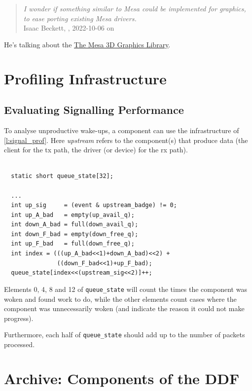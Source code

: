 \documentclass[a4paper,12pt]{report}
\newcommand{\code}[1]{\texttt{#1}}
\begin{document}
\begin{quotation}{\em
  I wonder if something similar to Mesa could be implemented for
  graphics, to ease porting existing Mesa drivers.}\\\noindent
  Isaac Beckett, , 2022-10-06 on 
\end{quotation}

He's talking about the \href{https://docs.mesa3d.org}{The Mesa 3D Graphics Library}.


\chapter{Profiling Infrastructure}

\section{Evaluating Signalling Performance}

To analyse unproductive wake-ups, a component can use the
infrastructure of \autoref{l:signal_prof}. Here \emph{upstream} refers
to the component(s) that produce data (the client for the \gls{tx} path, the
driver (or device) for the \gls{rx} path).


\begin{lstlisting}[gobble=2, firstline=2, float=h, label={l:signal_prof},
  caption={Profiling signalling effectiveness.}]

  static short queue_state[32];

  ...
  int up_sig     = (event & upstream_badge) != 0;
  int up_A_bad   = empty(up_avail_q);
  int down_A_bad = full(down_avail_q);
  int down_F_bad = empty(down_free_q);
  int up_F_bad   = full(down_free_q);
  int index = (((up_A_bad<<1)+down_A_bad)<<2) +
               ((down_F_bad<<1)+up_F_bad);
  queue_state[index<<(upstream_sig<<2)]++;
\end{lstlisting}

Elements 0, 4, 8 and 12 of \code{queue\_state} will count the times
the component was woken and found work to do, while the other elements
count cases where the component was unnecessarily woken (and indicate
the reason it could not make progress).

Furthermore, each half of \code{queue\_state} should add up to the
number of packets processed.



\chapter{Archive: Components of the DDF}
\end{document}
